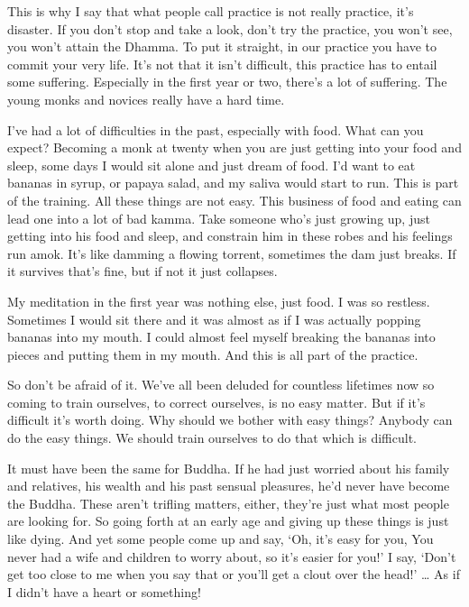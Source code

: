 This is why I say that what people call practice is not really practice, it's disaster. If you don't stop and take a look, don't try the practice, you won't see, you won't attain the Dhamma. To put it straight, in our practice you have to commit your very life. It's not that it isn't difficult, this practice has to entail some suffering. Especially in the first year or two, there's a lot of suffering. The young monks and novices really have a hard time.

I've had a lot of difficulties in the past, especially with food. What can you expect? Becoming a monk at twenty when you are just getting into your food and sleep, some days I would sit alone and just dream of food. I'd want to eat bananas in syrup, or papaya salad, and my saliva would start to run. This is part of the training. All these things are not easy. This business of food and eating can lead one into a lot of bad kamma. Take someone who's just growing up, just getting into his food and sleep, and constrain him in these robes and his feelings run amok. It's like damming a flowing torrent, sometimes the dam just breaks. If it survives that's fine, but if not it just collapses.

My meditation in the first year was nothing else, just food. I was so restless. Sometimes I would sit there and it was almost as if I was actually popping bananas into my mouth. I could almost feel myself breaking the bananas into pieces and putting them in my mouth. And this is all part of the practice.

So don't be afraid of it. We've all been deluded for countless lifetimes now so coming to train ourselves, to correct ourselves, is no easy matter. But if it's difficult it's worth doing. Why should we bother with easy things? Anybody can do the easy things. We should train ourselves to do that which is difficult.

It must have been the same for Buddha. If he had just worried about his family and relatives, his wealth and his past sensual pleasures, he'd never have become the Buddha. These aren't trifling matters, either, they're just what most people are looking for. So going forth at an early age and giving up these things is just like dying. And yet some people come up and say, `Oh, it's easy for you,  You never had a wife and children to worry about, so it's easier for you!' I say, `Don't get too close to me when you say that or you'll get a clout over the head!' \ldots{} As if I didn't have a heart or something!

